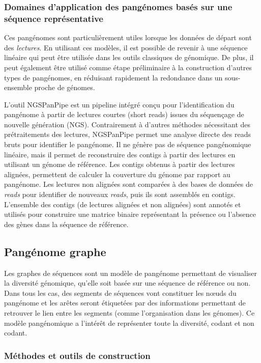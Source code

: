 \subsubsection{Domaines d'application des pangénomes basés sur une séquence représentative}

Ces pangénomes sont particulièrement utiles lorsque les données de départ sont des \textit{lectures}. En utilisant ces modèles, il est possible de revenir à une séquence linéaire qui peut être utilisée dans les outils classiques de génomique. De plus, il peut également être utilisé comme étape préliminaire à la construction d'autres types de pangénomes, en réduisant rapidement la redondance dans un sous-ensemble proche de génomes. 

L'outil NGSPanPipe \cite{kulsum_ngspanpipe_2018} est un pipeline intégré conçu pour l'identification du pangénome à partir de lectures courtes (short reads) issues du séquençage de nouvelle génération (NGS). Contrairement à d'autres méthodes nécessitant des prétraitements des lectures, NGSPanPipe permet une analyse directe des reads bruts pour identifier le pangénome. Il ne génère pas de séquence pangénomique linéaire, mais il permet de reconstruire des contigs à partir des lectures en utilisant un génome de référence. Les contigs obtenus à partir des lectures alignées, permettent de calculer la couverture du génome par rapport au pangénome. Les lectures non alignées sont comparées à des bases de données de \textit{reads} pour identifier de nouveaux \textit{reads}, puis ils sont assemblés en contigs. L'ensemble des contigs (de lectures alignées et non alignées) sont annotés et utilisés pour construire une matrice binaire représentant la présence ou l'absence des gènes dans la séquence de référence.

\subsection{Pangénome graphe}

Les graphes de séquences sont un modèle de pangénome permettant de visualiser la diversité génomique, qu’elle soit basée sur une séquence de référence ou non. Dans tous les cas, des segments de séquences vont constituer les n\oe uds du pangénome et les arêtes seront étiquetées par des informations permettant de retrouver le lien entre les segments (comme l'organisation dans les génomes). Ce modèle pangénomique a l'intérêt de représenter toute la diversité, codant et non codant. 

\subsubsection{Méthodes et outils de construction}

